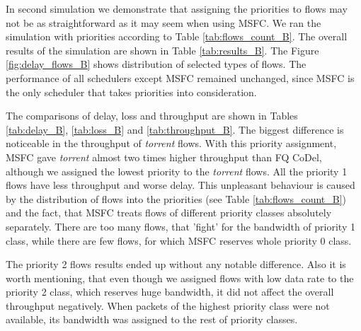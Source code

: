 In second simulation we demonstrate that assigning the priorities to flows may not be as straightforward as it may seem when using MSFC. We ran the simulation with priorities according to Table \ref{tab:flows_count_B}. The overall results of the simulation are shown in Table \ref{tab:results_B}. The Figure \ref{fig:delay_flows_B} shows distribution of selected types of flows. The performance of all schedulers except MSFC remained unchanged, since MSFC is the only scheduler that takes priorities into consideration.

The comparisons of delay, loss and throughput are shown in Tables \ref{tab:delay_B}, \ref{tab:loss_B} and \ref{tab:throughput_B}. The biggest difference is noticeable in the throughput of \emph{torrent} flows. With this priority assignment, MSFC gave \emph{torrent} almost two times higher throughput than FQ CoDel, although we assigned the lowest priority to the \emph{torrent} flows. All the priority 1 flows have less throughput and worse delay. This unpleasant behaviour is caused by the distribution of flows into the priorities (see Table \ref{tab:flows_count_B}) and the fact, that MSFC treats flows of different priority classes absolutely separately. There are too many flows, that 'fight' for the bandwidth of priority 1 class, while there are few flows, for which MSFC reserves whole priority 0 class.

The priority 2 flows results ended up without any notable difference. Also it is worth mentioning, that even though we assigned flows with low data rate to the priority 2 class, which reserves huge bandwidth, it did not affect the overall throughput negatively. When packets of the highest priority class were not available, its bandwidth was assigned to the rest of priority classes.





